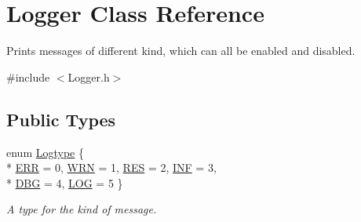 \hypertarget{classLogger}{\section{Logger Class Reference}
\label{classLogger}
}


Prints messages of different kind, which can all be enabled and disabled.  




{\ttfamily \#include $<$Logger.\-h$>$}

\subsection*{Public Types}
\begin{DoxyCompactItemize}
\item 
enum \hyperlink{classLogger_ac9e601f90bf326ce2088de52018861dc}{Logtype} \{ \\*
\hyperlink{classLogger_ac9e601f90bf326ce2088de52018861dca482a49db2a0d40e2ae358619edb1633e}{E\-R\-R} = 0, 
\hyperlink{classLogger_ac9e601f90bf326ce2088de52018861dca90d291baa55088591aae64883cfc58bd}{W\-R\-N} = 1, 
\hyperlink{classLogger_ac9e601f90bf326ce2088de52018861dca97ed8522dfcbb2cdf29c7f46e583f42f}{R\-E\-S} = 2, 
\hyperlink{classLogger_ac9e601f90bf326ce2088de52018861dca174739f9b95ebbf75fbb89001f72443b}{I\-N\-F} = 3, 
\\*
\hyperlink{classLogger_ac9e601f90bf326ce2088de52018861dcaecb59ecf12f943da56b6944a3053dc09}{D\-B\-G} = 4, 
\hyperlink{classLogger_ac9e601f90bf326ce2088de52018861dca07be7495a7931bee16f5d94b3671f5de}{L\-O\-G} = 5
 \}
\begin{DoxyCompactList}\small\item\em A type for the kind of message. \end{DoxyCompactList}\end{DoxyCompactItemize}
